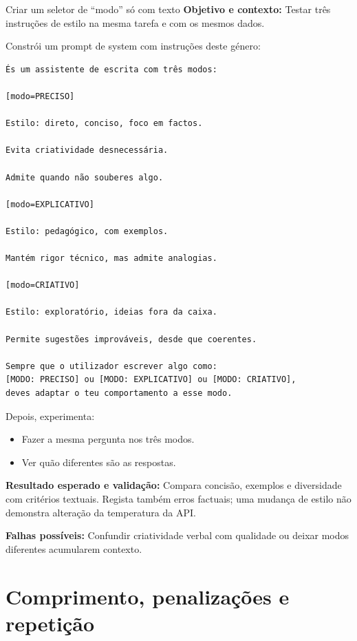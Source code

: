 \begin{promptlabbox}{Criar um seletor de “modo” só com texto}
\textbf{Objetivo e contexto:} Testar três instruções de estilo na mesma tarefa e com os mesmos dados.

Constrói um prompt de system com instruções deste género:

\medskip

\begin{lstlisting}
És um assistente de escrita com três modos:

[modo=PRECISO]

Estilo: direto, conciso, foco em factos.

Evita criatividade desnecessária.

Admite quando não souberes algo.

[modo=EXPLICATIVO]

Estilo: pedagógico, com exemplos.

Mantém rigor técnico, mas admite analogias.

[modo=CRIATIVO]

Estilo: exploratório, ideias fora da caixa.

Permite sugestões improváveis, desde que coerentes.

Sempre que o utilizador escrever algo como:
[MODO: PRECISO] ou [MODO: EXPLICATIVO] ou [MODO: CRIATIVO],
deves adaptar o teu comportamento a esse modo.
\end{lstlisting}

Depois, experimenta:

\begin{itemize}[leftmargin=*]
\item Fazer a mesma pergunta nos três modos.
\item Ver quão diferentes são as respostas.
\end{itemize}

\textbf{Resultado esperado e validação:} Compara concisão, exemplos e diversidade com critérios textuais. Regista também erros factuais; uma mudança de estilo não demonstra alteração da temperatura da API.

\textbf{Falhas possíveis:} Confundir criatividade verbal com qualidade ou deixar modos diferentes acumularem contexto.
\end{promptlabbox}

\section{Comprimento, penalizações e repetição}


